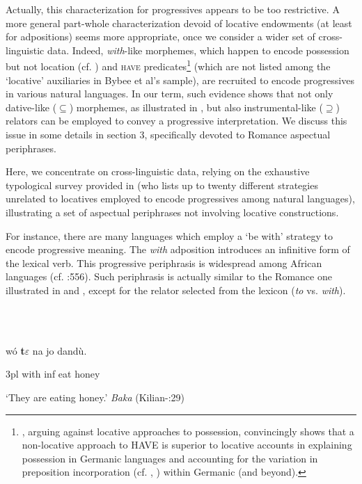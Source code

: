 \documentclass[output=paper]{langsci/langscibook}
\begin{document}
Actually, this characterization for progressives appears to be too restrictive. A more general part-whole characterization devoid of locative endowments (at least for adpositions) seems more appropriate, once we consider a wider set of cross-linguistic data. Indeed, \textit{with}{}-like morphemes, which happen to encode possession but not location (cf. \citealt{Levinson2011}) and \textsc{have} predicates\footnote{\citet{Levinson2011}, arguing against locative approaches to possession, convincingly shows that a non-locative approach to HAVE is superior to locative accounts in explaining possession in Germanic languages and accounting for the variation in preposition incorporation (cf. \citealt{Kayne1993}, \citealt{Harley2002}) within Germanic (and beyond).} (which are not listed among the ‘locative’ auxiliaries in Bybee et al’s sample), are recruited to encode progressives in various natural languages. In our term, such evidence shows that not only dative-like (${\subseteq}$) morphemes, as illustrated in , but also instrumental-like (${\supseteq}$) relators can be employed to convey a progressive interpretation. We discuss this issue in some details in section 3, specifically devoted to Romance aspectual periphrases. 

Here, we concentrate on cross-linguistic data, relying on the exhaustive typological survey provided in \citet{Cinque2017} (who lists up to twenty different strategies unrelated to locatives employed to encode progressives among natural languages), illustrating a set of aspectual periphrases not involving locative constructions. 

For instance, there are many languages which employ a ‘be with’ strategy to encode progressive meaning. The \textit{with} adposition introduces an infinitive form of the lexical verb. This progressive periphrasis is widespread among African languages (cf. \citealt{Cinque2017}:556). Such periphrasis is actually similar to the Romance one illustrated in  and , except for the relator selected from the lexicon (\textit{to} vs. \textit{with}).

\ea%
    \label{ex:key:12}
    \gll\\
        \\
    \glt
    \z

           wó  \textbf{t$\varepsilon$}   na   jo   dandù.

3pl   with   inf   eat   honey

‘They are eating honey.’     \textit{Baka} (Kilian-\citealt{Hatz1992}:29)
\end{document}
